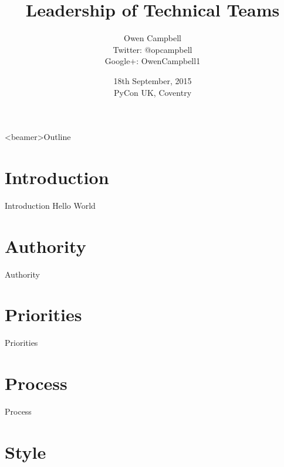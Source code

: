 \documentclass{beamer}
\title{Leadership of Technical Teams}
\author{
  Owen Campbell\\
  \vspace{1cm}
  Twitter: @opcampbell\\
  Google+: OwenCampbell1
}
\date[PyCon UK 2015]{18th September, 2015\\PyCon UK, Coventry}
\begin{document}
\begin{frame}
  \titlepage{}
\end{frame}

{
  \begin{frame}<beamer>{Outline}
    \tableofcontents
  \end{frame}
}

  \section{Introduction}

    \begin{frame}{Introduction}
      Hello World
    \end{frame}


  \section{Authority}

    \begin{frame}{Authority}
    \end{frame}

  \section{Priorities}

    \begin{frame}{Priorities}
    \end{frame}

  \section{Process}

    \begin{frame}{Process}
    \end{frame}

  \section{Style}
\end{document}
